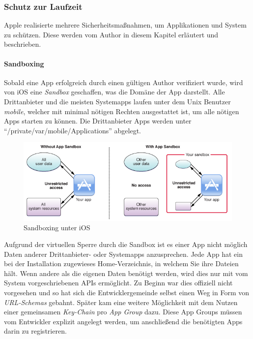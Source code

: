 	\subsubsection{Schutz zur Laufzeit}
		Apple realisierte mehrere Sicherheitsmaßnahmen, um Applikationen und System zu
		schützen. Diese werden vom Author in diesem Kapitel erläutert und 
		beschrieben.
		
		\paragraph{Sandboxing}\label{sec:sandboxing}
			Sobald eine App erfolgreich durch einen gültigen Author verifiziert wurde,
			wird von iOS eine \textsl{Sandbox} geschaffen, was die Domäne der App
			darstellt. Alle Drittanbieter und die meisten Systemapps laufen unter dem
			Unix Benutzer \textsl{mobile}, welcher mit minimal nötigen Rechten
			ausgestattet ist, um alle nötigen Apps starten zu können. Die
			Drittanbieter Apps werden unter "`/private/var/mobile/Applications"'
			abgelegt.
			\begin{figure}[h]
				\centering
				\includegraphics[width=0.9\linewidth]{ios/media/sandboxing.png}
				\caption{Sandboxing unter iOS 
				\cite{IOSSandboxing}}
				\label{fig:sandboxing}
			\end{figure}
			Aufgrund der virtuellen Sperre durch die Sandbox ist es einer App nicht
			möglich Daten anderer Drittanbieter- oder Systemapps anzusprechen. Jede App
			hat ein bei der Installation zugewieses Home-Verzeichnis, in
			welchem Sie ihre Dateien hält. Wenn andere als die eigenen Daten benötigt
			werden, wird dies nur mit vom System vorgeschriebenen APIs ermöglicht. Zu
			Beginn war dies offiziell nicht vorgesehen und so hat sich die
			Entwicklergemeinde selbst einen Weg in Form von \textsl{URL-Schemas}
			gebahnt. Später kam eine weitere Möglichkeit mit dem Nutzen einer
			gemeinsamen \textsl{Key-Chain} pro \textsl{App Group}
			dazu\cite[S.83]{Banks2015}. Diese App Groups müssen vom Entwickler explizit
			angelegt werden, um anschließend die benötigten Apps darin zu registrieren.
				
